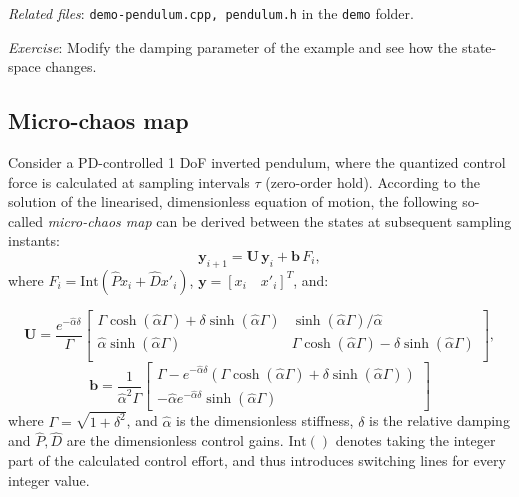 \documentclass[11pt]{article}
\begin{document}
\noindent \emph{Related files}: \texttt{demo-pendulum.cpp, pendulum.h} in the \texttt{demo} folder.

\noindent \emph{Exercise}: Modify the damping parameter of the example and see how the state-space changes.

\newpage

\subsection{Micro-chaos map}

Consider a PD-controlled 1 DoF inverted pendulum, where the quantized control force is calculated at sampling intervals $\tau$ (zero-order hold). According to the solution of the linearised, dimensionless equation of motion, the following so-called \emph{micro-chaos map} can be derived between the states at subsequent sampling instants:
\begin{equation}\label{eq:microchaos}
\mathbf{y}_{i+1}=\mathbf{U}\,\mathbf{y}_i+\mathbf{b} \,F_i,
\end{equation}
where $F_i=\mathrm{Int}(\hat P x_{i}+\hat D x'_{i})$, $\mathbf{y}=[x_i\quad x'_i]^T$, and:

\begin{equation} 
\mathbf{U}=\frac{e^{-\hat{\alpha} \delta}}{\Gamma}
\left[
\begin{array}{cc}
\Gamma  \cosh \left(\hat{\alpha } \Gamma \right)+\delta  \sinh \left(\hat{\alpha } \Gamma  \right) & \sinh \left(\hat{\alpha } \Gamma  \right)/\hat{\alpha } \\
\hat{\alpha } \sinh \left(\hat{\alpha } \Gamma  \right) & \Gamma  \cosh \left(\hat{\alpha } \Gamma  \right)-\delta  \sinh \left(\hat{\alpha } \Gamma  \right) \\
\end{array}
\right], \nonumber
\end{equation}
\begin{equation}
\mathbf{b}=\frac{1}{{\hat\alpha}^2 \Gamma}\left[\begin{array}{cc}
\Gamma -e^{-\hat{\alpha } \delta } \left(\Gamma  \cosh \left(\hat{\alpha } \Gamma  \right)+\delta \sinh \left(\hat{\alpha } \Gamma  \right)\right) \\
-\hat{\alpha} e^{- \hat{\alpha } \delta }\sinh \left(\hat{\alpha } \Gamma  \right)
\end{array}\right] \nonumber
\end{equation}
where $\Gamma=\sqrt{1+\delta^2}$, and $\hat{\alpha}$ is the dimensionless stiffness, $\delta$ is the relative damping and $\hat{P}, \hat{D}$ are the dimensionless control gains. $\mathrm{Int}()$ denotes taking the integer part of the calculated control effort, and thus introduces switching lines for every integer value.
\end{document}
